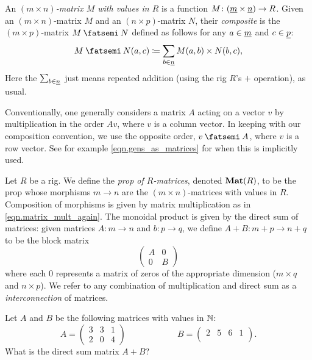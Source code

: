 \documentclass[7Sketches]{subfiles}
\begin{document}
An \emph{$(m\times n)$-matrix $M$ with values in $R$} is a function
$M\colon(\underline{{m}}\times\underline{{n}}) \to R$.  Given an $(m\times n)$-matrix $M$ and an $(n
\times p)$-matrix $N$, their \emph{composite} is the $(m\times p)$-matrix $M\cp N$
defined as follows for any $a \in \underline{{m}}$ and $c \in \underline{{p}}$:
\begin{equation}%
\label{eqn.matrix_mult_again}
  M\cp N(a,c) \coloneqq \sum_{b \in \ord{n}} M(a,b)\times N(b,c),
\end{equation}
Here the $\sum_{b\in \underline{{n}}}$ just
means repeated addition (using the rig $R$'s $+$ operation), as usual.

\begin{remark}
Conventionally, one generally considers a matrix $A$ acting on a vector $v$ by multiplication in the order $Av$, where $v$ is a column vector. In keeping with our composition convention, we use the opposite order, $v\cp A$, where $v$ is a row vector. See for example \cref{eqn.gens_as_matrices} for when this is implicitly used.
\end{remark}%

\begin{definition}%
\label{def.prop_matrices}%
  Let $R$ be a rig. We define the \emph{prop of $R$-matrices}, denoted $\mathbf{Mat}(R)$,
  to be the prop whose morphisms $m\to n$ are the $(m\times n)$-matrices
  with values in $R$. Composition of morphisms is given
  by matrix multiplication as in \cref{eqn.matrix_mult_again}. The monoidal product is given by the direct sum of
  matrices: given matrices $A\colon m \to n$ and $b\colon p \to q$, we define
  $A+B\colon m+p \to n+q$ to be the block matrix
  \[
  \begin{pmatrix}
  A & 0 \\
  0 & B
  \end{pmatrix}
  \]
  where each $0$ represents a matrix of zeros of the appropriate dimension ($m\times q$ and $n\times p$). We refer to any combination of multiplication and direct sum as a \emph{interconnection} of matrices.
\end{definition}

\begin{exercise}%
\label{exc.monoidal_mat_prod}
Let $A$ and $B$ be the following matrices with values in $\mathbb{N}$:
\[
A=\left(
\begin{array}{ccc}
	3&3&1\\
	2&0&4
\end{array}
\right)
\hspace{1in}
B=\left(
\begin{array}{cccc}
	2&5&6&1\\
\end{array}
\right).
\]
What is the direct sum matrix $A+B$?
\end{exercise}
\end{document}

